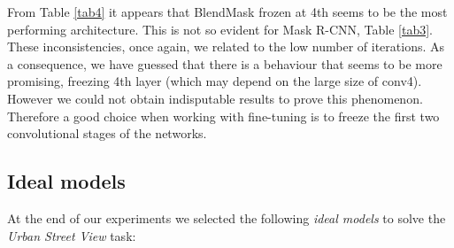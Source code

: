 \documentclass[10pt,twocolumn,letterpaper]{article}
\begin{document}
From Table \ref{tab4} it appears that BlendMask frozen at 4th seems to be the most performing architecture. This is not so evident for Mask R-CNN, Table \ref{tab3}. These inconsistencies, once again, we related to the low number of iterations. As a consequence, we have guessed that there is a behaviour that seems to be more promising, freezing 4th layer (which may depend on the large size of conv4). However we could not obtain indisputable results to prove this phenomenon. Therefore a good choice when working with fine-tuning is to freeze the first two convolutional stages of the networks.


\subsection{Ideal models}
At the end of our experiments we selected the following \textit{ideal models} to solve the \textit{Urban Street View} task:
\end{document}

